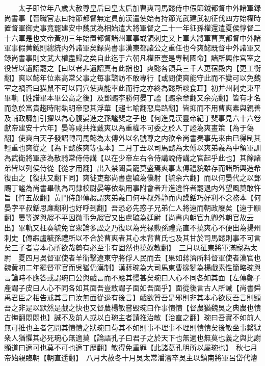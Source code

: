 　　太子即位年八歲大赦尊皇后曰皇太后加曹爽司馬懿侍中假節鉞都督中外諸軍録尚書事【晉職官志曰持節都督無定員前漢遣使始有持節光武建武初征伐四方始權時置督軍御史事竟罷建安中魏武為相始遣大將軍督之二十一年征孫權還遣夏侯惇督二十六軍是也文帝黃初三年始置都督諸州軍事或領刺史又上軍大將軍曹真都督中外諸軍事假黄鉞則總統内外諸軍矣録尚書事漢東都諸公之重任也今爽懿既督中外諸軍又録尚書事則文武大權盡歸之矣自此迄于六朝凡權臣壹是專制國命】諸所興作宫室之役皆以遺詔罷之【曰以者非遺詔真有此指也】爽懿各領兵三千人更宿殿内【更工衡翻】爽以懿年位素高常父事之每事諮訪不敢專行【或問使爽能守此而不變可以免魏室之禍否曰猫鼠不可以同穴使爽能率此而行之亦終為懿所啖食耳】初并州刺史東平畢軌【姓譜畢本畢公高之後】及鄧颺李勝何晏丁謐【颺余章翻又余亮翻】皆有才名而急於富貴趨時附埶明帝惡其浮華【趨七喻翻惡烏路翻】皆抑而不用曹爽素與親善及輔政驟加引擢以為心腹晏進之孫謐斐之子也【何進見漢靈帝紀丁斐事見六十六卷獻帝建安十六年】晏等咸共推戴爽以為重權不可委之於人丁謐為爽畫策【為于偽翻】使爽白天子發詔轉司馬懿為太傅外以名號尊之内欲令尚書奏事先來由已得制其輕重也爽從之【為下懿族爽等張本】二月丁丑以司馬懿為太傅以爽弟羲為中領軍訓為武衛將軍彦為散騎常侍侍講【以在少帝左右令侍講說侍講之官起乎此也】其餘諸弟皆以列侯侍從【從才用翻】出入禁闥貴寵莫盛焉爽事太傅禮貌雖存而諸所興造希復由之【復扶又翻下同】爽徙吏部尚書盧毓為僕射【毓余六翻】而以何晏代之以鄧颺丁謐為尚書畢軌為司隸校尉晏等依埶用事附會者升進違忤者罷退内外望風莫敢忤旨【忤五故翻】黃門侍郎傳嘏謂爽弟羲曰何平叔外静而内躁銛巧好利不念務本【何晏字平叔銛思亷翻利也好呼到翻】吾恐必先惑子兄弟仁人將遠而朝政廢矣【遠于願翻】晏等遂與嘏不平因微事免嘏官又出盧毓為廷尉【尚書内朝官九卿外朝官故云出】畢軌又枉奏毓免官衆論多訟之乃復以為光禄勲孫禮亮直不撓爽心不便出為揚州刺史【傳嘏盧毓孫禮所以不合於曹爽者其心未背曹氏也及其甘於司馬懿則事不可言矣三子者豈本心所欲哉勢有必至事有固然也撓奴教翻】　三月以征東將軍滿寵為太尉　夏四月吳督軍使者羊衜擊遼東守將俘人民而去【果如蔣濟所料督軍使者漢官也魏黄初二年罷督軍官而吳猶仍漢制】漢蔣琬為大司馬東曹掾犍為楊戲素性簡略琬與言論時不應答或謂琬曰公與戲言而不應其慢甚矣琬曰人心不同各如其面【左傳鄭子產謂子皮曰人心不同各如其面吾豈敢謂子面如吾面乎】面從後言古人所誡【尚書舜禹君臣之相告戒其言曰汝無面從退有後言】戲欲贊吾是邪則非其本心欲反吾言則顯吾之非是以默然是戲之快也又督農楊敏嘗毁琬曰作事憒憒【督農猶魏吳之典農也憒古悔翻悶悶也】誠不及前人或以白琬主者請推治敏【治直之翻】琬曰吾實不如前人無可推也主者乞問其憒憒之狀琬曰苟其不如則事不理事不理則憒憒矣後敏坐事繫獄衆人猶懼其必死琬心無適莫【論語孔子曰君子之於天下也無適也無莫也義之與比謝顯道曰適可也莫不可也適丁歷翻】敏得免重罪【此諸葛孔明所以屬琬也】　秋七月帝始親臨朝【朝直遥翻】　八月大赦冬十月吳太常潘濬卒吳主以鎮南將軍呂岱代濬

